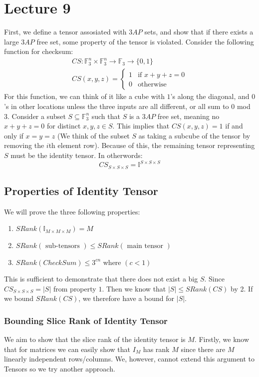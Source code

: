 \documentclass[11pt]{article}
\theoremstyle{definition}
\begin{document}
\section{Lecture 9}
First, we define a tensor assosiated with $3AP$ sets, and show that if there exists a large $3AP$ free set, some property of the tensor is violated. Consider the following function for checksum:
\begin{align}
    CS: \mathbb{F}_3^n \times \mathbb{F}_3^n \to \mathbb{F}_3 \rightarrow \{0,1\}\\
    CS(x,y,z) = \begin{cases} 1 & \text{if } x+y+z = 0\\
    0 & \text{otherwise} \end{cases}
\end{align}
For this function, we can think of it like a cube with $1$'s along the diagonal, and $0$'s in other locations unless the three inputs are all different, or all sum to $0$ mod $3$. Consider a subset $S \subseteq \mathbb{F}_3^n$ such that $S$ is a $3AP$ free set, meaning no $x+y+z=0$ for distinct $x,y,z \in S$. This implies that $CS(x,y,z) = 1$ if and only if $x=y=z$ (We think of the subset $S$ as taking a subcube of the tensor by removing the $i$th element row). Because of this, the remaining tensor representing $S$ must be the identity tensor. In otherwords:
$$CS_{S \times S \times S} = \mathbb{I}^{S \times S \times S}$$
\subsection{Properties of Identity Tensor}
We will prove the three following properties:
\begin{enumerate}
    \item $SRank(\mathbb{I}_{M\times M\times M}) = M$
    \item $SRank(\text{ sub-tensors }) \leq SRank(\text{ main tensor })$
    \item $SRank(CheckSum) \leq 3^{cn}$ where $(c < 1)$
\end{enumerate}
This is sufficient to demonstrate that there does not exist a big $S$. Since $CS_{S\times S\times S} = |S|$ from property $1$. Then we know that $|S| \leq SRank(CS)$ by 2. If we bound $SRank(CS)$, we therefore have a bound for $|S|$.
\subsubsection{Bounding Slice Rank of Identity Tensor}
We aim to show that the slice rank of the identity tensor is $M$. Firstly, we know that for matrices we can easily show that $I_M$ has rank $M$ since there are $M$ linearly independent rows/columns. We, however, cannot extend this argument to Tensors so we try another approach.
\bigskip
\end{document}
